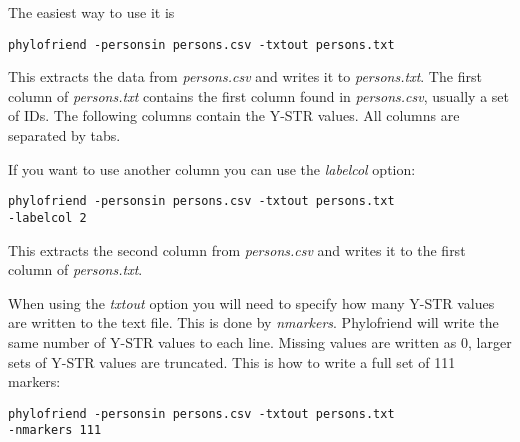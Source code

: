 The easiest way to use it is

\noindent\texttt{phylofriend -personsin persons.csv -txtout persons.txt}

This extracts the data from \emph{persons.csv} and writes
it to \emph{persons.txt}. The first column of \emph{persons.txt}
contains the first column found in \emph{persons.csv}, usually
a set of IDs. The following columns contain the Y-STR values.
All columns are separated by tabs.

If you want to use another column you can use the
\emph{labelcol} option:

\noindent\texttt{phylofriend -personsin persons.csv -txtout persons.txt\\
-labelcol 2}

This extracts the second column from \emph{persons.csv} and
writes it to the first column of \emph{persons.txt}.

When using the \emph{txtout} option you will need to specify
how many Y-STR values are written to the text file. This is
done by \emph{nmarkers}. Phylofriend will write the same number
of Y-STR values to each line. Missing values are written as
0, larger sets of Y-STR values are truncated. This is how to
write a full set of 111 markers:

\noindent\texttt{phylofriend -personsin persons.csv -txtout persons.txt\\
-nmarkers 111}
















